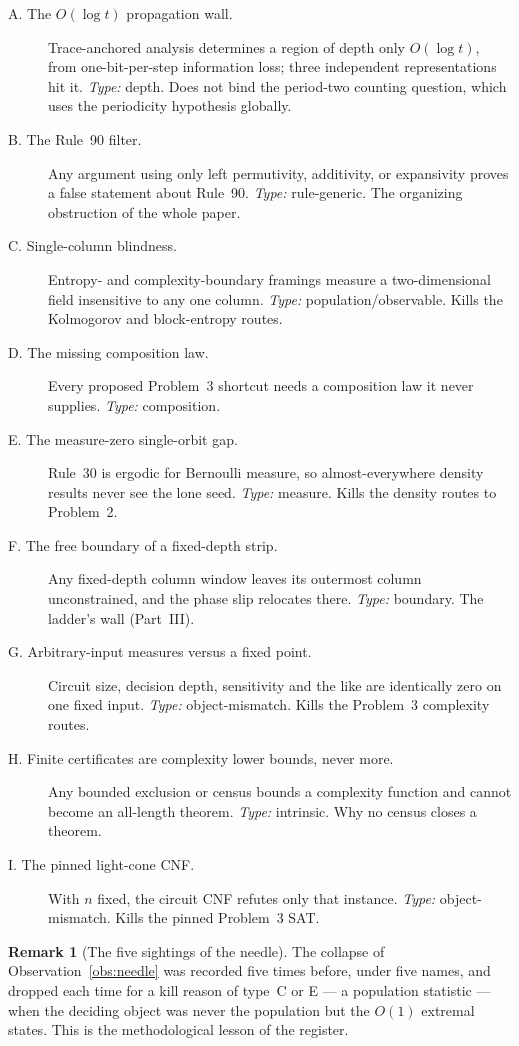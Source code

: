 \documentclass[11pt]{article}
\theoremstyle{definition}
\newtheorem{remark}[theorem]{Remark}
\begin{document}
\begin{description}
\item[A. The $O(\log t)$ propagation wall.] Trace-anchored analysis determines a
  region of depth only $O(\log t)$, from one-bit-per-step information loss; three
  independent representations hit it. \emph{Type:} depth. Does not bind the
  period-two counting question, which uses the periodicity hypothesis globally.
\item[B. The Rule~90 filter.] Any argument using only left permutivity,
  additivity, or expansivity proves a false statement about Rule~90.
  \emph{Type:} rule-generic. The organizing obstruction of the whole paper.
\item[C. Single-column blindness.] Entropy- and complexity-boundary framings
  measure a two-dimensional field insensitive to any one column. \emph{Type:}
  population/observable. Kills the Kolmogorov and block-entropy routes.
\item[D. The missing composition law.] Every proposed Problem~3 shortcut needs a
  composition law it never supplies. \emph{Type:} composition.
\item[E. The measure-zero single-orbit gap.] Rule~30 is ergodic for Bernoulli
  measure, so almost-everywhere density results never see the lone seed.
  \emph{Type:} measure. Kills the density routes to Problem~2.
\item[F. The free boundary of a fixed-depth strip.] Any fixed-depth column window
  leaves its outermost column unconstrained, and the phase slip relocates there.
  \emph{Type:} boundary. The ladder's wall (Part~III).
\item[G. Arbitrary-input measures versus a fixed point.] Circuit size, decision
  depth, sensitivity and the like are identically zero on one fixed input.
  \emph{Type:} object-mismatch. Kills the Problem~3 complexity routes.
\item[H. Finite certificates are complexity lower bounds, never more.] Any
  bounded exclusion or census bounds a complexity function and cannot become an
  all-length theorem. \emph{Type:} intrinsic. Why no census closes a theorem.
\item[I. The pinned light-cone CNF.] With $n$ fixed, the circuit CNF refutes only
  that instance. \emph{Type:} object-mismatch. Kills the pinned Problem~3 SAT.
\end{description}

\begin{remark}[The five sightings of the needle]
The collapse of Observation~\ref{obs:needle} was recorded five times before,
under five names, and dropped each time for a kill reason of type~C or E --- a
population statistic --- when the deciding object was never the population but the
$O(1)$ extremal states. This is the methodological lesson of the register.
\end{remark}
\end{document}

